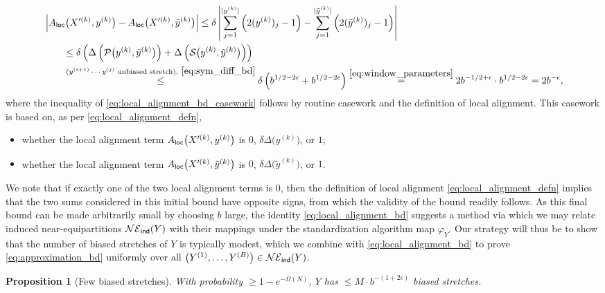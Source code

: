 \documentclass[11pt]{amsart}
\numberwithin{equation}{section}
\numberwithin{equation}{section}
\newcommand{\1}{\mathbbm{1}}
\newcommand{\ind}{\textup{\textsf{ind}}}
\newcommand{\loc}{\textup{\textsf{loc}}}
\newtheorem{proposition}[theorem]{Proposition}
\theoremstyle{definition}
\begin{document}
\begin{align}
    & \left| A_\loc\big(X'^{(k)}, y^{(k)}\big) - A_\loc\big(X'^{(k)}, \tilde{y}^{(k)}\big) \right| \leq \delta \left| \sum_{j=1}^{|y^{(k)}|} \left( 2(y^{(k)})_j - 1 \right) - \sum_{j=1}^{|\tilde{y}^{(k)}|} \left( 2(\tilde{y}^{(k)})_j - 1 \right) \right| \label{eq:local_alignment_bd_casework} \\
    & \qquad \leq \delta \left( \Delta\left( \mathcal P\big(y^{(k)}, \tilde{y}^{(k)}\big) \right) + \Delta\left( \mathcal S\big(y^{(k)}, \tilde{y}^{(k)}\big) \right) \right) \nonumber \\
    & \qquad \stackrel{\text{($y^{(i+1)} \cdots y^{(j)}$ unbiased stretch)}, \ \eqref{eq:sym_diff_bd}}{\leq} \delta \left( b^{1/2-2\epsilon} + b^{1/2-2\epsilon} \right) \stackrel{\eqref{eq:window_parameters}}{=} 2b^{-1/2+\epsilon} \cdot b^{1/2-2\epsilon} = 2b^{-\epsilon}, \label{eq:local_alignment_bd}
\end{align}
where the inequality of \eqref{eq:local_alignment_bd_casework} follows by routine casework and the definition of local alignment. This casework is based on, as per \eqref{eq:local_alignment_defn}, 
\begin{itemize}
    \item whether the local alignment term $A_\loc\big(X'^{(k)}, y^{(k)}\big)$ is $0$, $\delta \Delta\big(y^{(k)}\big)$, or $1$;
    \item whether the local alignment term $A_\loc\big(X'^{(k)}, \tilde{y}^{(k)}\big)$ is $0$, $\delta \Delta\big(\tilde{y}^{(k)}\big)$, or $1$.
\end{itemize}
We note that if exactly one of the two local alignment terms is $0$, then the definition of local alignment \eqref{eq:local_alignment_defn} implies that the two sums considered in this initial bound have opposite signs, from which the validity of the bound readily follows. As this final bound can be made arbitrarily small by choosing $b$ large, the identity \eqref{eq:local_alignment_bd} suggests a method via which we may relate induced near-equipartitions $\mathcal{NE}_\ind(Y)$ with their mappings under the standardization algorithm map $\varphi_{Y}$. Our strategy will thus be to show that the number of biased stretches of $Y$ is typically modest, which we combine with \eqref{eq:local_alignment_bd} to prove \eqref{eq:approximation_bd} uniformly over all $\big( Y^{(1)}, \dots, Y^{(B)} \big) \in \mathcal{NE}_\ind(Y)$.

\begin{proposition}[Few biased stretches] \label{prop:few_biased_stretches}
    With probability $\geq 1 - e^{-\Omega(N)}$, $Y$ has $\leq M \cdot b^{-(1+2\epsilon)}$ biased stretches.
\end{proposition}
\end{document}
